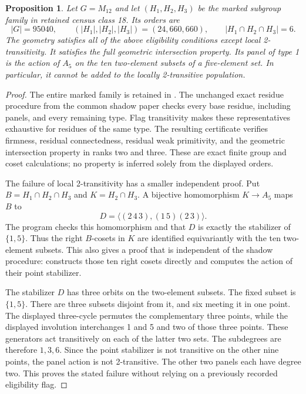 \documentclass[11pt,a4paper]{article}
\newtheorem{proposition}{Proposition}
\begin{document}
\begin{proposition}
Let $G=M_{12}$ and let $(H_1,H_2,H_3)$ be the marked subgroup family
in retained census class 18. Its orders are
\[
 |G|=95040,\qquad (|H_1|,|H_2|,|H_3|)=(24,660,660),
 \qquad |H_1\cap H_2\cap H_3|=6.
\]
The geometry satisfies all of the above eligibility conditions except
local 2-transitivity. It satisfies the full geometric intersection
property. Its panel of type 1 is the action of $A_5$ on the ten
two-element subsets of a five-element set. In particular, it cannot
be added to the locally 2-transitive population.
\end{proposition}
\begin{proof}
The entire marked family is retained in
. The unchanged exact residue procedure
from the common shadow paper checks every base residue, including
panels, and every remaining type. Flag transitivity makes these
representatives exhaustive for residues of the same type. The resulting
certificate verifies firmness, residual connectedness, residual weak
primitivity, and the geometric intersection property in ranks two and
three. These are exact finite group and coset calculations; no property
is inferred solely from the displayed orders.

The failure of local 2-transitivity has a smaller independent proof.
Put $B=H_1\cap H_2\cap H_3$ and $K=H_2\cap H_3$. A bijective
homomorphism $K\longrightarrow A_5$ maps $B$ to
\[
 D=\langle(2\,4\,3),(1\,5)(2\,3)\rangle.
\]
The program  checks this homomorphism and
that $D$ is exactly the stabilizer of $\{1,5\}$. Thus the right
$B$-cosets in $K$ are identified equivariantly with the ten two-element
subsets. This also gives a proof that is independent of the shadow
procedure:  constructs those ten right cosets directly
and computes the action of their point stabilizer.

The stabilizer $D$ has three orbits on the two-element subsets. The
fixed subset is $\{1,5\}$. There are three subsets disjoint from it,
and six meeting it in one point. The displayed three-cycle permutes
the complementary three points, while the displayed involution
interchanges 1 and 5 and two of those three points. These generators
act transitively on each of the latter two sets. The subdegrees are
therefore $1,3,6$. Since the point stabilizer is not transitive on
the other nine points, the panel action is not 2-transitive. The
other two panels each have degree two. This proves the stated
failure without relying on a previously recorded eligibility flag.
\end{proof}
\end{document}
